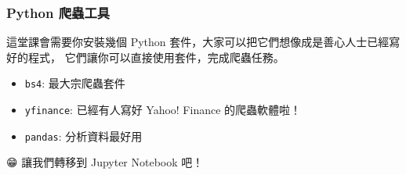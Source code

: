 \documentclass{beamer}
\newcommand{\code}[1]{\texttt{\textcolor{pinky}{#1}}}
\begin{document}
\begin{frame}
    \frametitle{Python 爬蟲工具}
    這堂課會需要你安裝幾個 Python 套件，大家可以把它們想像成是善心人士已經寫好的程式，
    它們讓你可以直接使用套件，完成爬蟲任務。

    \begin{itemize}
        \item \code{bs4}: 最大宗爬蟲套件
        \item \code{yfinance}: 已經有人寫好 Yahoo! Finance 的爬蟲軟體啦！
        \item \code{pandas}: 分析資料最好用
    \end{itemize}

\end{frame}

\begin{frame}
    
    {\DejaSans 😁} 讓我們轉移到 Jupyter Notebook 吧！

\end{frame}
\end{document}
